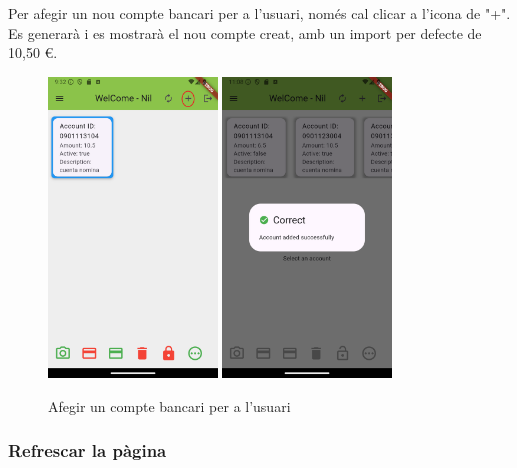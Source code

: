 \documentclass[a4paper,12pt,twoside]{ThesisStyle}
\begin{document}
Per afegir un nou compte bancari per a l'usuari, només cal clicar a l'icona de "+". Es generarà i es mostrarà el nou compte creat, amb un import per defecte de 10,50 €.

\begin{figure}[h]
    \centering
    \includegraphics[width=0.4\textwidth]{imatges/mainpageAccount8.png}
    \includegraphics[width=0.4\textwidth]{imatges/addAccount.png}
    \caption{Afegir un compte bancari per a l'usuari}
    \label{fig: Afegir un compte bancari per a l'usuari}
\end{figure}


\clearpage
\subsubsection{Refrescar la pàgina}
\label{subsubsec:Refrescar la pàgina}
\end{document}
